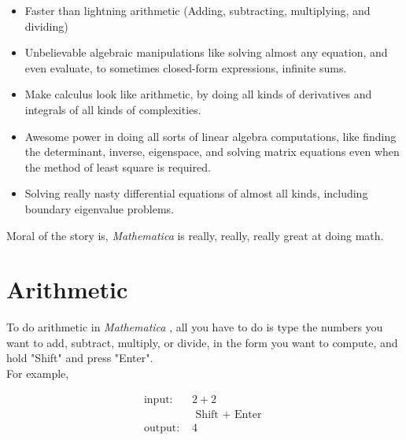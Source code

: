 \documentclass[11pt,letterpaper,twoside,titlepage]{report}
\newcommand{\Mathematica}{\textit{Mathematica} }
\begin{document}
		\begin{itemize}
		
			\item %
			
				Faster than lightning arithmetic (Adding, subtracting, multiplying, and dividing)
				
			\item %
			
				Unbelievable algebraic manipulations like solving almost any equation, and even evaluate, to sometimes closed-form expressions, infinite sums.
				
			\item %
			
				Make calculus look like arithmetic, by doing all kinds of derivatives and integrals of all kinds of complexities.
				
			\item %
			
				Awesome power in doing all sorts of linear algebra computations, like finding the determinant, inverse, eigenspace, and solving matrix equations even when the method of least square is required.
				
			\item %
			
				Solving really nasty differential equations of almost all kinds, including boundary eigenvalue problems.
		
		\end{itemize}
		
		Moral of the story is, \Mathematica is really, really, really great at doing math.
		
		\chapter{Arithmetic}
			
			To do arithmetic in \Mathematica, all you have to do is type the numbers you want to add, subtract, multiply, or divide, in the form you want to compute, and hold "Shift" and press "Enter". \\
			
			For example, 
			
			\begin{align*}
				\text{input: }& 2 + 2 \\
				& \text{ Shift + Enter } \\
				\text{output: }& 4 \\
			\end{align*}
			
\end{document}

